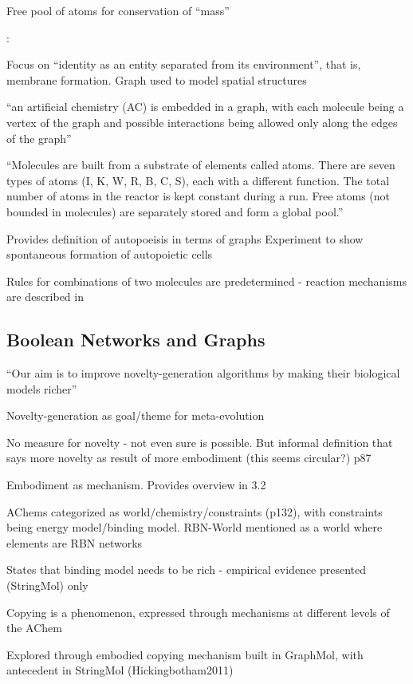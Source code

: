 Free pool of atoms for conservation of ``mass''

\autocite{Fenizio2001}:

Focus on ``identity as an entity separated from its environment'', that is, membrane formation. Graph used to model spatial structures

``an artificial chemistry (AC) is embedded in a graph, with each molecule being a vertex of the graph and possible interactions being allowed only along the edges of the graph''

``Molecules are built from a substrate of elements called atoms. There are seven types of atoms (I, K, W, R, B, C, S), each with a different function. The total number of atoms in the reactor is kept constant during a run. Free atoms (not bounded in molecules) are separately stored and form a global pool.''

Provides definition of autopoeisis in terms of graphs 
Experiment to show spontaneous formation of autopoietic cells

Rules for combinations of two molecules are predetermined - reaction mechanisms are described in \autocite{Fenizio2000}

\subsection{Boolean Networks and Graphs}

\autocite{Nellis2012}

``Our aim is to improve novelty-generation algorithms by making their biological models richer''

Novelty-generation as goal/theme for meta-evolution

No measure for novelty - not even sure is possible. But informal definition that says more novelty as result of more embodiment (this seems circular?) p87

Embodiment as mechanism. Provides overview in 3.2

AChems categorized as world/chemistry/constraints (p132), with constraints being energy model/binding model. RBN-World mentioned as a world where elements are RBN networks

States that binding model needs to be rich - empirical evidence presented (StringMol) only

Copying is a phenomenon, expressed through mechanisms at different levels of the AChem

Explored through embodied copying mechanism built in GraphMol, with antecedent in StringMol (Hickingbotham2011)


